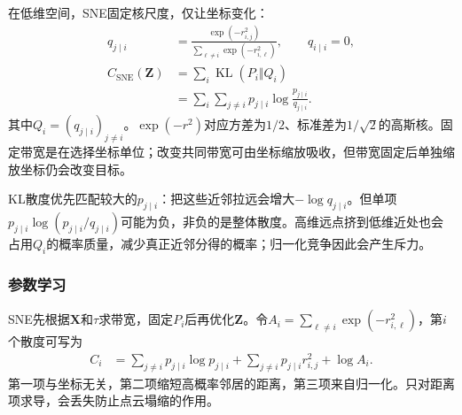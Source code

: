 在低维空间，SNE固定核尺度，仅让坐标变化：
\begin{equation}
  \label{eq:dim-sne-low-loss}
  \begin{aligned}
    q_{j\mid i}
      &=\frac{\exp(-r_{i,j}^2)}
      {\sum_{\ell\ne i}\exp(-r_{i,\ell}^2)},\qquad q_{i\mid i}=0,\\
    C_{\mathrm{SNE}}(\bm{Z})
      &=\sum_i\operatorname{KL}(P_i\Vert Q_i)\\
      &=\sum_i\sum_{j\ne i}p_{j\mid i}
        \log\frac{p_{j\mid i}}{q_{j\mid i}}.
  \end{aligned}
\end{equation}
其中$Q_i=(q_{j\mid i})_{j\ne i}$。$\exp(-r^2)$对应方差为$1/2$、标准差为$1/\sqrt{2}$的高斯核。固定带宽是在选择坐标单位；改变共同带宽可由坐标缩放吸收，但带宽固定后单独缩放坐标仍会改变目标。

KL散度优先匹配较大的$p_{j\mid i}$：把这些近邻拉远会增大$-\log q_{j\mid i}$。但单项$p_{j\mid i}\log(p_{j\mid i}/q_{j\mid i})$可能为负，非负的是整体散度。高维远点挤到低维近处也会占用$Q_i$的概率质量，减少真正近邻分得的概率；归一化竞争因此会产生斥力。

\subsubsection{参数学习}

SNE先根据$\bm{X}$和$\tau$求带宽，固定$P_i$后再优化$\bm{Z}$。令$A_i=\sum_{\ell\ne i}\exp(-r_{i,\ell}^2)$，第$i$个散度可写为
\begin{equation}
  \label{eq:dim-sne-anchor-loss}
  \begin{aligned}
    C_i&=\sum_{j\ne i}p_{j\mid i}\log p_{j\mid i}
      +\sum_{j\ne i}p_{j\mid i}r_{i,j}^2+\log A_i.
  \end{aligned}
\end{equation}
第一项与坐标无关，第二项缩短高概率邻居的距离，第三项来自归一化。只对距离项求导，会丢失防止点云塌缩的作用。

